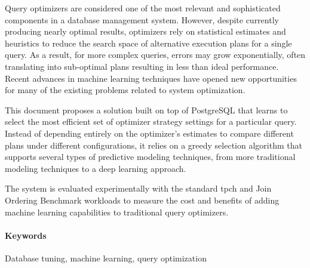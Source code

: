 Query optimizers are considered one of the most relevant and sophisticated components in a database management system. However, despite currently producing nearly optimal results, optimizers rely on statistical estimates and heuristics to reduce the search space of alternative execution plans for a single query. As a result, for more complex queries, errors may grow exponentially, often translating into sub-optimal plans resulting in less than ideal performance. Recent advances in machine learning techniques have opened new opportunities for many of the existing problems related to system optimization. 

This document proposes a solution built on top of PostgreSQL that learns to select the most efficient set of optimizer strategy settings for a particular query. Instead of depending entirely on the optimizer's estimates to compare different plans under different configurations, it relies on a greedy selection algorithm that supports several types of predictive modeling techniques, from more traditional modeling techniques to a deep learning approach.

The system is evaluated experimentally with the standard \gls{tpch} and Join Ordering Benchmark workloads to measure the cost and benefits of adding machine learning capabilities to traditional query optimizers.

\paragraph{Keywords} Database tuning, machine learning, query optimization